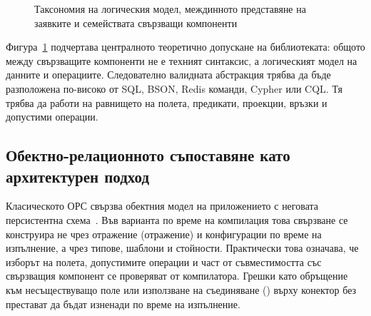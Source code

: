 \begin{figure}[H]
\centering
{}
\caption{Таксономия на логическия модел, междинното представяне на заявките и семействата свързващи компоненти}
\label{fig:storage_taxonomy}
\end{figure}

Фигура~\ref{fig:storage_taxonomy} подчертава централното теоретично допускане на библиотеката: общото между свързващите компоненти не е техният синтаксис, а логическият модел на данните и операциите. Следователно валидната абстракция трябва да бъде разположена по-високо от SQL, BSON, Redis команди, Cypher или CQL. Тя трябва да работи на равнището на полета, предикати, проекции, връзки и допустими операции.

\subsection{Обектно-релационното съпоставяне като архитектурен подход}

Класическото ОРС свързва обектния модел на приложението с неговата персистентна схема~\cite{fowler2002}. Във варианта по време на компилация това свързване се конструира не чрез отражение (отражение) и конфигурации по време на изпълнение, а чрез типове, шаблони и  стойности. Практически това означава, че изборът на полета, допустимите операции и част от съвместимостта със свързващия компонент се проверяват от компилатора. Грешки като обръщение към несъществуващо поле или използване на съединяване () върху конектор без  престават да бъдат изненади по време на изпълнение.


